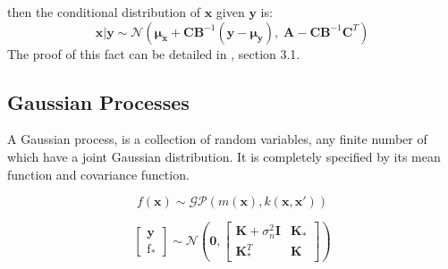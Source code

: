 then the conditional distribution of $\bm{x}$ given $\bm{y}$ is:
\begin{equation}
  \bm{x}|\bm{y} \sim \mathcal{N}\left(\bm{\mu_x} + \bm{C} \bm{B}^{-1}(\bm{y}-\bm{\mu_y}), \; \bm{A} - \bm{C}\bm{B}^{-1}\bm{C}^T \right)
\end{equation}
The proof of this fact can be detailed in \citep{Bishop}, section 3.1.

\subsection{Gaussian Processes}
A Gaussian process, is a collection of random variables, any finite number of which have a joint Gaussian distribution. It is completely specified by its mean function and covariance function.

\begin{equation}
  f(\bm{x}) \sim \mathcal{GP}(m(\bm{x}), k(\bm{x}, \bm{x'}))
\end{equation}

\begin{equation}
  \begin{bmatrix}
    \bm{y} \\ \bm{\mathrm{f}}_*
  \end{bmatrix}
  \sim \mathcal{N}\left(
  \bm{0}, \begin{bmatrix}
      \bm{K}+\sigma_n^2 \bm{I} & \bm{K}_* \\ \bm{K}_*^T & \bm{K}
    \end{bmatrix} \right)
\end{equation}
